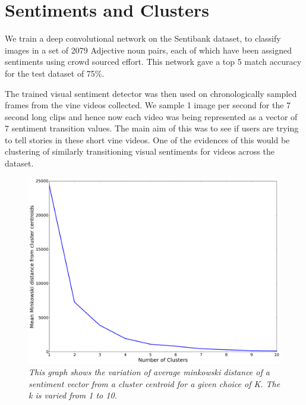 \section{Sentiments and Clusters}
We train a deep convolutional network on the Sentibank \cite{sentibank} dataset, to classify images in a set of 2079 Adjective noun pairs, each of which have been assigned sentiments using crowd sourced effort. This network gave a top 5 match accuracy for the test dataset of 75\%. 
\par
The trained visual sentiment detector was then used on chronologically sampled frames from the vine videos collected. We sample 1 image per second for the 7 second long clips and hence now each video was being represented as a vector of 7 sentiment transition values. The main aim of this was to see if users are trying to tell stories in these short vine videos. One of the evidences of this would be clustering of similarly transitioning visual sentiments for videos across the dataset. 

\begin{figure}
\centering
\includegraphics[width=\columnwidth]{plots/grouping_graph_clusters}
\caption{\textsl{This graph shows the variation of average minkowski distance of a sentiment vector from a cluster centroid for a given choice of K. The k is varied from 1 to 10.}}
\label{fig:elbow_points}
\end{figure}

